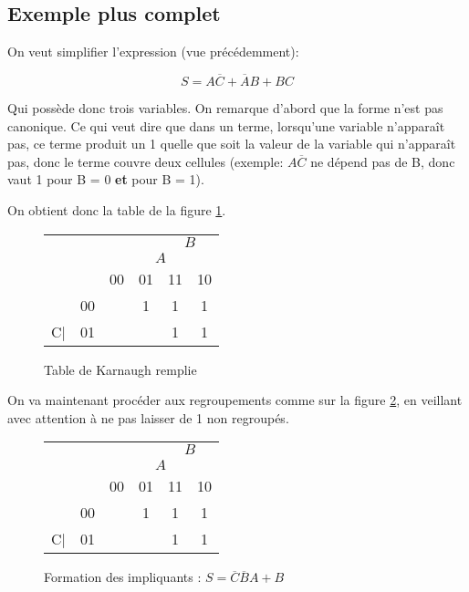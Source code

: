 \documentclass[a4paper,11pt]{book}
\theoremstyle{definition}
\theoremstyle{definition}
\begin{document}
\subsection{Exemple plus complet}
On veut simplifier l'expression (vue précédemment):

\[ S = A\overline{C} + \overline{A}B + BC\]

Qui possède donc trois variables. On remarque d'abord que la forme n'est pas canonique. Ce qui veut dire que dans un terme, lorsqu'une variable n'apparaît pas, ce terme produit un 1 quelle que soit la valeur de la variable qui n'apparaît pas, donc le terme couvre deux cellules (exemple: $A\overline{C}$ ne dépend pas de B, donc vaut 1 pour B = 0 \textbf{et} pour B = 1).

On obtient donc la table de la figure \ref{tab:karnaughEx1.1}.


\begin{figure}
  \centering
  \begin{tabular}{|cc|c|c|c|c|}
    \hline
         & & \multicolumn{2}{c}{} & \multicolumn{2}{c|}{\underline{$\:\:\:B\:\:\:$}} \\
         & & \multicolumn{1}{c}{}& \multicolumn{2}{c}{\underline{$\:\:\:A\:\:\:$}} & \\
         & &  00 & 01 & 11 & 10 \\
    \hline 
         & 00 &  & 1 & 1 & 1\\
    \cline{2-6}
         C| & 01 & & & 1 & 1\\
    \hline
  \end{tabular}
  \caption{Table de Karnaugh remplie}
  \label{tab:karnaughEx1.1}
\end{figure}

On va maintenant procéder aux regroupements comme sur la figure \ref{tab:karnaughEx1.2}, en veillant avec attention à ne pas laisser de 1 non regroupés.

\begin{figure}
  \centering
  \begin{tabular}{|cc|c|c|c|c|}
    \hline
         & & \multicolumn{2}{c}{} & \multicolumn{2}{c|}{\underline{$\:\:\:B\:\:\:$}} \\
         & & \multicolumn{1}{c}{}& \multicolumn{2}{c}{\underline{$\:\:\:A\:\:\:$}} & \\
         & &  00 & 01 & 11 & 10 \\
    \hline 
         & 00 &  & \cellcolor{red!25}1 & \cellcolor{blue!25}1 & \cellcolor{blue!25}1\\
    \cline{2-6}
         C| & 01 & & & \cellcolor{blue!25}1 & \cellcolor{blue!25}1\\
    \hline
  \end{tabular}
  \caption{Formation des impliquants : $S=\overline{C}\overline{B}A+B$}
  \label{tab:karnaughEx1.2}
\end{figure}
\end{document}
